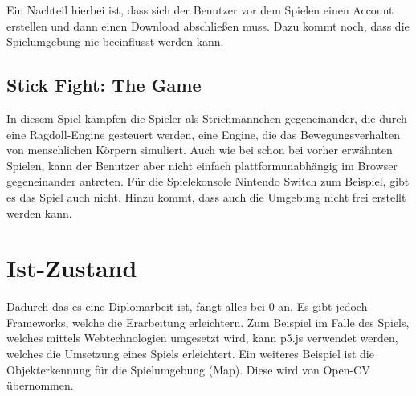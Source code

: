 Ein Nachteil hierbei ist, dass sich der Benutzer vor dem Spielen einen Account erstellen
und dann einen Download abschließen muss. Dazu kommt noch, dass die Spielumgebung nie beeinflusst werden kann.

\subsection{Stick Fight: The Game}
In diesem Spiel kämpfen die Spieler als Strichmännchen gegeneinander, die durch eine Ragdoll-Engine gesteuert werden, eine Engine, die das Bewegungsverhalten von menschlichen Körpern simuliert.
Auch wie bei schon bei vorher erwähnten Spielen, kann der Benutzer aber nicht einfach plattformunabhängig im Browser gegeneinander antreten.
Für die Spielekonsole Nintendo Switch zum Beispiel, gibt es das Spiel auch nicht. Hinzu kommt, dass auch die Umgebung nicht frei erstellt werden kann.

\section{Ist-Zustand}
Dadurch das es eine Diplomarbeit ist, fängt alles bei 0 an. Es gibt jedoch Frameworks,
welche die Erarbeitung erleichtern. Zum Beispiel im Falle des Spiels, welches
mittels Webtechnologien umgesetzt wird, kann p5.js verwendet werden, welches die
Umsetzung eines Spiels erleichtert. Ein weiteres Beispiel ist die Objekterkennung für
die Spielumgebung (Map). Diese wird von Open-CV übernommen.